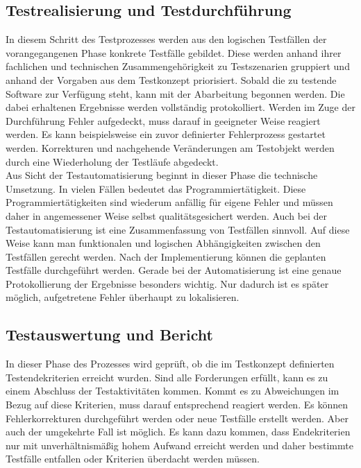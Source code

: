 \subsection{Testrealisierung und Testdurchführung}
\label{subsec:testrealisierung_und_durchführung}
In diesem Schritt des Testprozesses werden aus den logischen Testfällen der vorangegangenen Phase konkrete Testfälle gebildet.
Diese werden anhand ihrer fachlichen und technischen Zusammengehörigkeit zu Testszenarien gruppiert und anhand der Vorgaben aus dem Testkonzept priorisiert.
Sobald die zu testende Software zur Verfügung steht, kann mit der Abarbeitung begonnen werden. Die dabei erhaltenen Ergebnisse werden vollständig protokolliert. Werden im Zuge der Durchführung Fehler aufgedeckt, muss darauf in geeigneter Weise reagiert werden. Es kann beispielsweise ein zuvor definierter Fehlerprozess gestartet werden.
Korrekturen und nachgehende Veränderungen am Testobjekt werden durch eine Wiederholung der Testläufe abgedeckt.\\
Aus Sicht der Testautomatisierung beginnt in dieser Phase die technische Umsetzung.
In vielen Fällen bedeutet das Programmiertätigkeit. Diese Programmiertätigkeiten sind wiederum anfällig für eigene Fehler und müssen daher in angemessener Weise selbst qualitätsgesichert werden. Auch bei der Testautomatisierung ist eine Zusammenfassung von Testfällen sinnvoll. Auf diese Weise kann man funktionalen und logischen Abhängigkeiten zwischen den Testfällen gerecht werden.
Nach der Implementierung können die geplanten Testfälle durchgeführt werden.
Gerade bei der Automatisierung ist eine genaue Protokollierung der Ergebnisse besonders wichtig.
Nur dadurch ist es später möglich, aufgetretene Fehler überhaupt zu lokalisieren.


\subsection{Testauswertung und Bericht}
\label{subsec:testauswertung_und_bericht}
In dieser Phase des Prozesses wird geprüft, ob die im Testkonzept definierten Testendekriterien erreicht wurden. Sind alle Forderungen erfüllt, kann es zu einem Abschluss der Testaktivitäten kommen. Kommt es zu Abweichungen im Bezug auf diese Kriterien, muss darauf entsprechend reagiert werden. Es können Fehlerkorrekturen durchgeführt werden oder neue Testfälle erstellt werden. Aber auch der umgekehrte Fall ist möglich. Es kann dazu kommen, dass Endekriterien nur mit unverhältnismäßig hohem Aufwand erreicht werden 
und daher bestimmte Testfälle entfallen oder Kriterien überdacht werden müssen.

